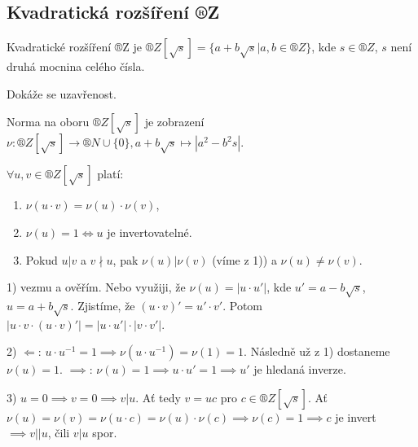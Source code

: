 \documentclass[12pt]{article}                   %
\begin{document}
    \subsection{Kvadratická rozšíření ®Z}
        \begin{definice}
            Kvadratické rozšíření ®Z je $®Z[\sqrt{s}] = \{a + b\sqrt{s}|a, b \in ®Z\}$, kde $s \in ®Z$, $s$ není druhá mocnina celého čísla.
            \begin{dukazin}[Tvar $®Z\[\sqrt{s}\]$]
                Dokáže se uzavřenost.
            \end{dukazin}
        \end{definice}

        \begin{definice}
            Norma na oboru $®Z[\sqrt{s}]$ je zobrazení $\nu : ®Z[\sqrt{s}] \rightarrow ®N \cup \{0\}, a+b\sqrt{s} \mapsto |a^2 - b^2s|$.
        \end{definice}

        \begin{tvrzeni}
            $\forall u, v \in ®Z[\sqrt{s}]$ platí:
            
            \begin{enumerate}
                \item $\nu(u·v) = \nu(u)·\nu(v)$,
                \item $\nu(u) = 1 \Leftrightarrow u$ je invertovatelné.
                \item Pokud $u|v$ a $v \nmid u$, pak $\nu(u)|\nu(v)$ (víme z 1)) a $\nu(u)≠\nu(v)$.
            \end{enumerate}

            \begin{dukazin}
                1) vezmu a ověřím. Nebo využiji, že $\nu(u) = |u·u'|$, kde $u' = a - b\sqrt{s}$, $u = a + b\sqrt{s}$. Zjistíme, že $(u·v)' = u'·v'$. Potom $|u·v·(u·v)'| = |u·u'|·|v·v'|$.

                2) $\Leftarrow$: $u·u^{-1} = 1 \implies \nu(u·u^{-1}) = \nu(1) = 1$. Následně už z 1) dostaneme $\nu(u) = 1$. $\implies$: $\nu(u) = 1 \implies u·u' = 1 \implies u'$ je hledaná inverze.

                3) $u = 0 \implies v = 0 \implies v|u$. Ať tedy $v = uc$ pro $c \in ®Z[\sqrt{s}]$. Ať $\nu(u) = \nu(v) = \nu(u·c) = \nu(u)·\nu(c) \implies \nu(c) = 1 \implies c$ je invert $\implies v||u$, čili $v|u$ spor.
            \end{dukazin}
        \end{tvrzeni}
\end{document}
